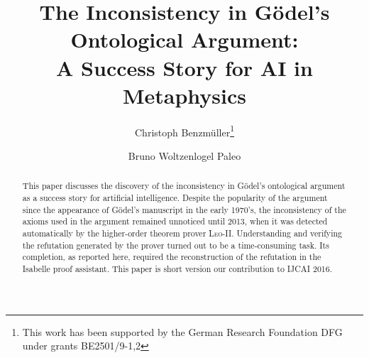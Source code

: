 \documentclass{llncs}
\begin{document}
\title{The Inconsistency in G\"odel's Ontological Argument: \\ A Success Story for AI in Metaphysics}
\author{Christoph Benzm\"uller\thanks{This work has been supported by
    the German Research Foundation DFG under grants BE2501/9-1,2} \and Bruno Woltzenlogel Paleo 
}


\maketitle            



\begin{abstract}
  This paper discusses the discovery of the inconsistency in G\"odel's
  ontological argument as a success story for artificial
  intelligence. Despite the popularity of the argument since the
  appearance of G\"odel's manuscript in the early 1970's, the
  inconsistency of the axioms used in the argument remained unnoticed
  until 2013, when it was detected automatically by the higher-order
  theorem prover \textsc{Leo-II}.  Understanding and verifying the
  refutation generated by the prover turned out to be a time-consuming
  task. Its completion, as reported here, required the
  reconstruction of the refutation in the Isabelle proof assistant.%
  This paper is short version our contribution to IJCAI 2016.
\end{abstract}
\end{document}
